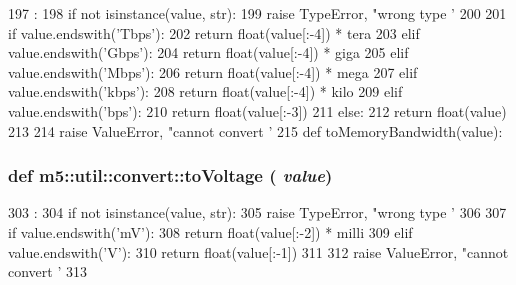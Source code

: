 \begin{DoxyCode}
197                              :
198     if not isinstance(value, str):
199         raise TypeError, "wrong type '%
200 
201     if value.endswith('Tbps'):
202         return float(value[:-4]) * tera
203     elif value.endswith('Gbps'):
204         return float(value[:-4]) * giga
205     elif value.endswith('Mbps'):
206         return float(value[:-4]) * mega
207     elif value.endswith('kbps'):
208         return float(value[:-4]) * kilo
209     elif value.endswith('bps'):
210         return float(value[:-3])
211     else:
212         return float(value)
213 
214     raise ValueError, "cannot convert '%
215 
def toMemoryBandwidth(value):
\end{DoxyCode}
\hypertarget{namespacem5_1_1util_1_1convert_a6b1f5cf7f135f56616327e035c5583e0}{
\subsubsection[{toVoltage}]{\setlength{\rightskip}{0pt plus 5cm}def m5::util::convert::toVoltage ( {\em value})}}
\label{namespacem5_1_1util_1_1convert_a6b1f5cf7f135f56616327e035c5583e0}



\begin{DoxyCode}
303                     :
304     if not isinstance(value, str):
305         raise TypeError, "wrong type '%
306 
307     if value.endswith('mV'):
308         return float(value[:-2]) * milli
309     elif value.endswith('V'):
310         return float(value[:-1])
311 
312     raise ValueError, "cannot convert '%
313 

\end{DoxyCode}


